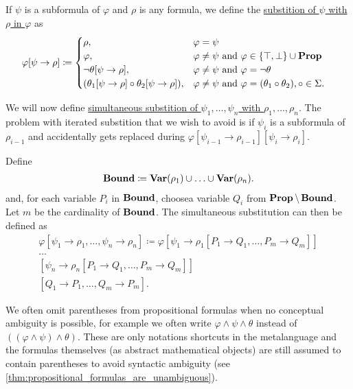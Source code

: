 \begin{definition}\label{def:propositional_substition}
  If $\psi$ is a subformula of $\varphi$ and $\rho$ is any formula, we define the \ul{substition of $\psi$ with $\rho$ in $\varphi$} as
  \begin{align*}
    \varphi[\psi \to \rho] &\coloneqq \begin{cases}
      \rho,                                                    &\varphi = \psi \\
      \varphi,                                                 &\varphi \neq \psi \text{ and } \varphi \in \{ \top, \bot \} \cup \operatorname{\mathbf{Prop}} \\
      \neg \theta[\psi \to \rho],                              &\varphi \neq \psi \text{ and } \varphi = \neg \theta \\
      (\theta_1[\psi \to \rho] \circ \theta_2[\psi \to \rho]), &\varphi \neq \psi \text{ and } \varphi = (\theta_1 \circ \theta_2), \circ \in \Sigma.
    \end{cases}
  \end{align*}

  We will now define \ul{simultaneous substition of $\psi_1, \ldots, \psi_n$ with $\rho_1, \ldots, \rho_n$}. The problem with iterated substition that we wish to avoid is if $\psi_i$ is a subformula of $\rho_{i-1}$ and accidentally gets replaced during $\varphi[\psi_{i-1} \to \rho_{i-1}][\psi_i \to \rho_i]$.

  Define
  \begin{align*}
    \operatorname{\mathbf{Bound}} \coloneqq \operatorname{\mathbf{Var}}(\rho_1) \cup \ldots \cup \operatorname{\mathbf{Var}}(\rho_n).
  \end{align*}
  and, for each variable $P_i$ in $\operatorname{\mathbf{Bound}}$, choose\AOC a variable $Q_i$ from $\operatorname{\mathbf{Prop}} \setminus \operatorname{\mathbf{Bound}}$. Let $m$ be the cardinality of $\operatorname{\mathbf{Bound}}$. The simultaneous substitution can then be defined as
  \begin{align*}
    \varphi[\psi_1 \to \rho_1, \ldots, \psi_n \to \rho_n] \coloneqq \varphi
    [\psi_1 \to \rho_1[P_1 \to Q_1, \ldots, P_m \to Q_m]] \\
    \ldots \\
    [\psi_n \to \rho_n[P_1 \to Q_1, \ldots, P_m \to Q_m]] \\
    [Q_1 \to P_1, \ldots, Q_m \to P_m].
  \end{align*}
\end{definition}

\begin{note}\label{note:propositional_formula_parentheses}
  We often omit parentheses from propositional formulas when no conceptual ambiguity is possible, for example we often write $\varphi \land \psi \land \theta$ instead of $((\varphi \land \psi) \land \theta)$. These are only notations shortcuts in the metalanguage and the formulas themselves (as abstract mathematical objects) are still assumed to contain parentheses to avoid syntactic ambiguity (see \cref{thm:propositional_formulas_are_unambiguous}).
\end{note}

